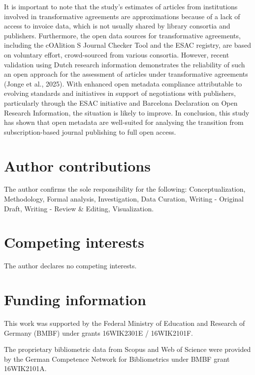 \documentclass[a4paper,man,floatsintext,longtable,noextraspace,10pt]{apa6}
\begin{document}
It is important to note that the study's estimates of articles from
institutions involved in transformative agreements are approximations
because of a lack of access to invoice data, which is not usually shared
by library consortia and publishers. Furthermore, the open data sources
for transformative agreements, including the cOAlition S Journal Checker
Tool and the ESAC registry, are based on voluntary effort, crowd-sourced
from various consortia. However, recent validation using Dutch research
information demonstrates the reliability of such an open approach for
the assessment of articles under transformative agreements (Jonge et
al., 2025). With enhanced open metadata compliance attributable to
evolving standards and initiatives in support of negotiations with
publishers, particularly through the ESAC initiative and Barcelona
Declaration on Open Research Information, the situation is likely to
improve. In conclusion, this study has shown that open metadata are
well-suited for analysing the transition from subscription-based journal
publishing to full open access.

\section*{Author contributions}\label{author-contributions}

The author confirms the sole responsibility for the following:
Conceptualization, Methodology, Formal analysis, Investigation, Data
Curation, Writing - Original Draft, Writing - Review \& Editing,
Visualization.

\section*{Competing interests}\label{competing-interests}

The author declares no competing interests.

\section*{Funding information}\label{funding-information}

This work was supported by the Federal Ministry of Education and
Research of Germany (BMBF) under grants 16WIK2301E / 16WIK2101F.

The proprietary bibliometric data from Scopus and Web of Science were
provided by the German Competence Network for Bibliometrics under BMBF
grant 16WIK2101A.
\end{document}
